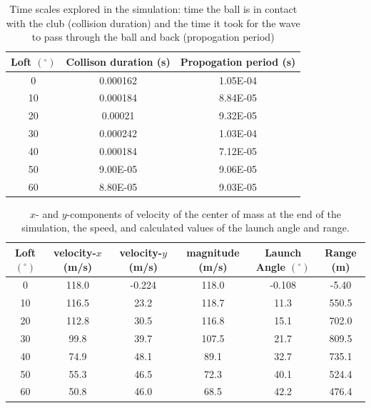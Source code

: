 \documentclass{article}
\begin{document}
\begin{table}
\begin{center}
\begin{tabular}{| c | | c | c |} \hline
Loft $(^{\circ})$ & Collison duration (s) & Propogation period (s) \\ \hline
0 & 0.000162 & 1.05E-04 \\
10 & 0.000184 & 8.84E-05 \\
20 & 0.00021 & 9.32E-05 \\
30 & 0.000242 & 1.03E-04 \\
40 & 0.000184 & 7.12E-05 \\
50 & 9.00E-05 & 9.06E-05 \\
60 & 8.80E-05 & 9.03E-05 \\ \hline
\end{tabular}
\label{time}
\caption{Time scales explored in the simulation: time the ball is in contact with the club (collision duration) and the time it took for the wave to pass through the ball and back (propogation period)}
\end{center}
\end{table}

\begin{table}
\begin{center}
\begin{tabular}{| c || c | c | c || c | c |} \hline
Loft $(^{\circ})$ & velocity-$x$ (m/s) & velocity-$y$ (m/s) & magnitude (m/s) & Launch Angle $(^{\circ})$ & Range (m)  \\ \hline
0 & 118.0 & -0.224 & 118.0 & -0.108 & -5.40 \\
10 & 116.5 & 23.2 & 118.7 & 11.3 & 550.5 \\
20 & 112.8 & 30.5 & 116.8 & 15.1 & 702.0 \\
30 & 99.8 & 39.7 & 107.5 & 21.7 & 809.5 \\
40 & 74.9 & 48.1 & 89.1 & 32.7 & 735.1 \\
50 & 55.3 & 46.5 & 72.3 & 40.1 & 524.4 \\
60 & 50.8 & 46.0 & 68.5 & 42.2 & 476.4 \\ \hline
\end{tabular} 
\label{velocities}
\caption{$x$- and $y$-components of velocity of the center of mass at the end of the simulation, the speed, and calculated values of the launch angle and range.}
\end{center}
\end{table}
\end{document}
